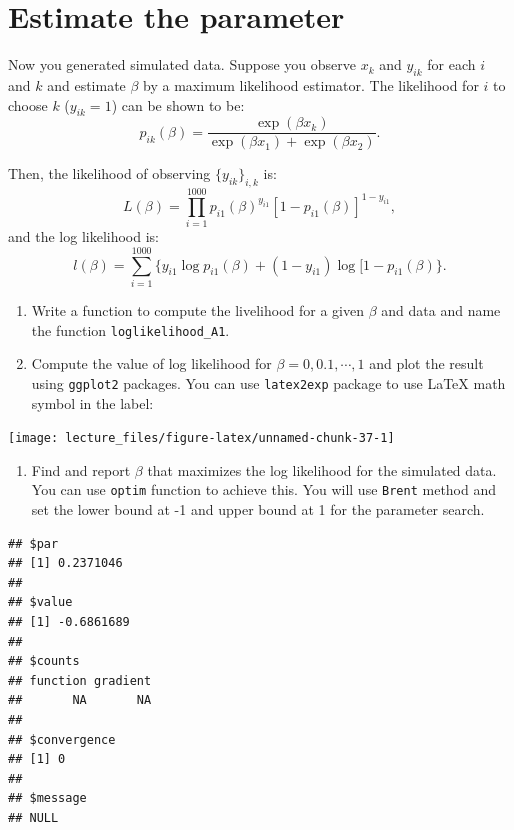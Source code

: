 \documentclass[]{book}
\providecommand{\tightlist}{%
  \setlength{\itemsep}{0pt}\setlength{\parskip}{0pt}}
\begin{document}
\section{Estimate the parameter}\label{estimate-the-parameter}

Now you generated simulated data. Suppose you observe \(x_k\) and
\(y_{ik}\) for each \(i\) and \(k\) and estimate \(\beta\) by a maximum
likelihood estimator. The likelihood for \(i\) to choose \(k\)
(\(y_{ik} = 1\)) can be shown to be: \[
p_{ik}(\beta) = \frac{\exp(\beta x_k)}{\exp(\beta x_1) + \exp(\beta x_2)}.
\]

Then, the likelihood of observing \(\{y_{ik}\}_{i, k}\) is: \[
L(\beta) = \prod_{i = 1}^{1000} p_{i1}(\beta)^{y_{i1}} [1 - p_{i1}(\beta)]^{1 - y_{i1}},
\] and the log likelihood is: \[
l(\beta) = \sum_{i = 1}^{1000}\{y_{i1}\log p_{i1}(\beta) + (1 - y_{i1})\log [1 - p_{i1}(\beta)\}.
\]

\begin{enumerate}
\def\labelenumi{\arabic{enumi}.}
\item
  Write a function to compute the livelihood for a given \(\beta\) and
  data and name the function \texttt{loglikelihood\_A1}.
\item
  Compute the value of log likelihood for \(\beta = 0, 0.1, \cdots, 1\)
  and plot the result using \texttt{ggplot2} packages. You can use
  \texttt{latex2exp} package to use LaTeX math symbol in the label:
\end{enumerate}

\begin{center}\texttt{[image: lecture\_files/figure-latex/unnamed-chunk-37-1]} \end{center}

\begin{enumerate}
\def\labelenumi{\arabic{enumi}.}
\tightlist
\item
  Find and report \(\beta\) that maximizes the log likelihood for the
  simulated data. You can use \texttt{optim} function to achieve this.
  You will use \texttt{Brent} method and set the lower bound at -1 and
  upper bound at 1 for the parameter search.
\end{enumerate}

\begin{verbatim}
## $par
## [1] 0.2371046
## 
## $value
## [1] -0.6861689
## 
## $counts
## function gradient 
##       NA       NA 
## 
## $convergence
## [1] 0
## 
## $message
## NULL
\end{verbatim}
\end{document}

